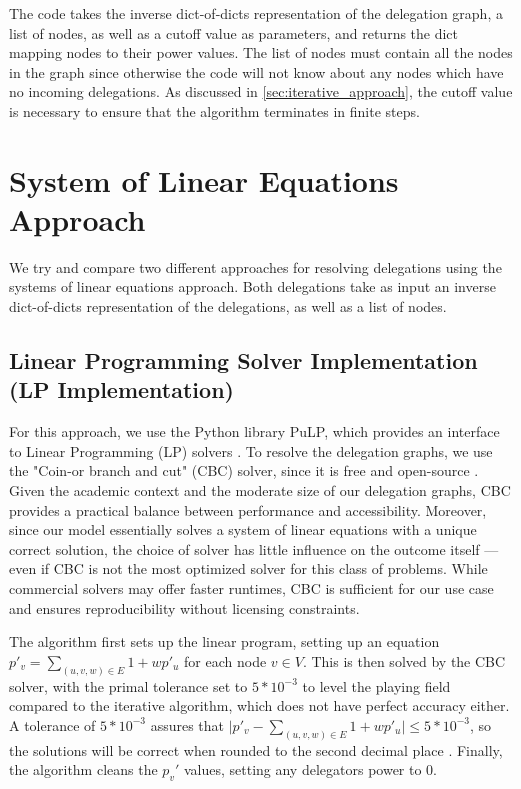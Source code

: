 The code takes the inverse dict-of-dicts representation of the delegation graph, a list of nodes, as well as a cutoff value as parameters, and returns the dict mapping nodes to their power values. The list of nodes must contain all the nodes in the graph since otherwise the code will not know about any nodes which have no incoming delegations. As discussed in \cref{sec:iterative_approach}, the cutoff value is necessary to ensure that the algorithm terminates in finite steps.

\section{System of Linear Equations Approach}

We try and compare two different approaches for resolving delegations using the systems of linear equations approach. Both delegations take as input an inverse dict-of-dicts representation of the delegations, as well as a list of nodes.

\subsection{Linear Programming Solver Implementation (LP Implementation)}

For this approach, we use the Python library PuLP, which provides an interface to Linear Programming (LP) solvers \cite{osullivanPuLPLinearProgramming2011}. To resolve the delegation graphs, we use the "Coin-or branch and cut" (CBC) solver, since it is free and open-source \cite{johnforrestCoinorCbcRelease2024}. Given the academic context and the moderate size of our delegation graphs, CBC provides a practical balance between performance and accessibility. Moreover, since our model essentially solves a system of linear equations with a unique correct solution, the choice of solver has little influence on the outcome itself — even if CBC is not the most optimized solver for this class of problems. While commercial solvers may offer faster runtimes, CBC is sufficient for our use case and ensures reproducibility without licensing constraints.

The algorithm first sets up the linear program, setting up an equation $p'_v = \sum_{(u, v, w) \in E} 1 + wp'_u$ for each node $v \in V$. This is then solved by the CBC solver, with the primal tolerance set to $5*10^{-3}$ to level the playing field compared to the iterative algorithm, which does not have perfect accuracy either. A tolerance of $5 * 10^{-3}$ assures that $\lvert p'_v -\sum_{(u, v, w) \in E} 1 + wp'_u \rvert \le 5*10^{-3}$, so the solutions will be correct when rounded to the second decimal place \cite{forrestCBCUserGuide2005}. Finally, the algorithm cleans the $p_v'$ values, setting any delegators power to 0. 

